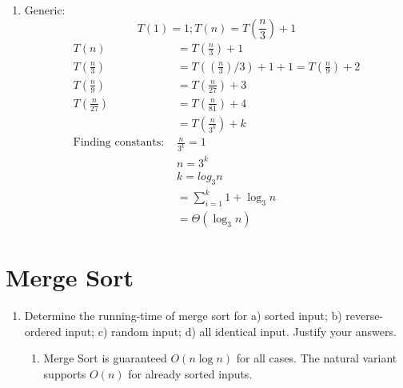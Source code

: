 \documentclass[11pt]{article}
\begin{document}
\begin{enumerate}
\begin{enumerate}
            \item Generic:
            $$T(1) = 1; T(n) = T(\frac{n}{3}) + 1$$
            \begin{equation}
                \label{eq4}
                \begin{split}
                    T(n) & = T(\frac{n}{3}) + 1 \\
                    T(\frac{n}{3}) & = T((\frac{n}{3}) / 3) + 1 + 1 = T(\frac{n}{9}) + 2 \\
                    T(\frac{n}{9}) & = T(\frac{n}{27}) + 3 \\
                    T(\frac{n}{27}) & = T(\frac{n}{81}) + 4 \\
                    & = T(\frac{n}{3^k}) + k \\
                    \text{Finding constants: } & \frac{n}{3^k} = 1 \\
                    & n = 3^k \\
                    & k = log_3 n \\
                    & = \sum_{i=1}^k 1 + \log_3 n \\
                    & = \Theta(\log_3 n)
                \end{split}
            \end{equation}
            
        \end{enumerate}
    
    \end{enumerate}
    \section{Merge Sort} 
    \begin{enumerate}
    
        \item Determine the running-time of merge sort for a) sorted input; b) reverse-ordered input; c) random input; d) all identical input. Justify your answers.
        \begin{enumerate}
            \item Merge Sort is guaranteed  $O(n \log n)$ for all cases. The natural variant supports $O(n)$ for already sorted inputs.
        \end{enumerate}
    
    \end{enumerate}
    
\end{document}
